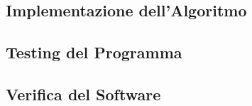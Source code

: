 \documentclass{article}
\begin{document}
\begin{enumerate}
\begin{algorithm} [hbt!]
\begin{algorithmic}
     
    \end{algorithmic}
    \end{algorithm}



    
\end{enumerate}

\newpage
\begin{center}
    \section{Implementazione dell'Algoritmo}
\end{center}

\newpage
\begin{center}
    \section{Testing del Programma}
\end{center}

\newpage
\begin{center}
    \section{Verifica del Software}
\end{center}
\end{document}
